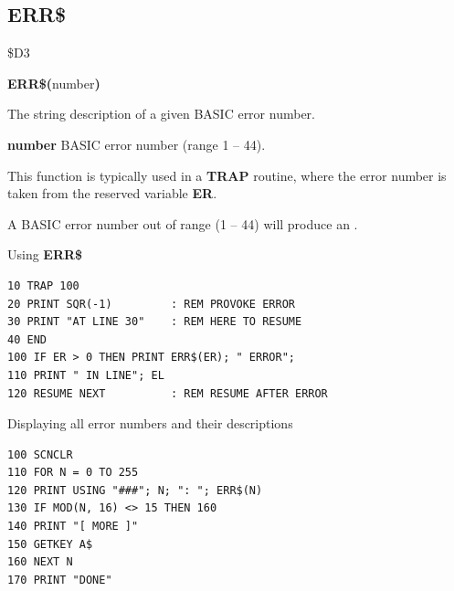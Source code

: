 
\newpage
\subsection{ERR\$}
\begin{description}[leftmargin=2cm,style=nextline]
\item [Token:]    \$D3

\item [Format:]   {\bf ERR\$(}number{\bf)}

\item [Returns:]  The string description of a given BASIC error number.

                  {\bf number} BASIC error number (range  1 -- 44).

                  This function is typically used in a {\bf TRAP} routine, where the error number is taken from the reserved variable {\bf ER}.

\item [Remarks:]  A BASIC error number out of range (1 -- 44) will produce an .

\item [Examples:] Using {\bf ERR\$}

\begin{tcolorbox}[colback=black,coltext=white]
\verbatimfont{\codefont}
\begin{verbatim}
10 TRAP 100
20 PRINT SQR(-1)         : REM PROVOKE ERROR
30 PRINT "AT LINE 30"    : REM HERE TO RESUME
40 END
100 IF ER > 0 THEN PRINT ERR$(ER); " ERROR";
110 PRINT " IN LINE"; EL
120 RESUME NEXT          : REM RESUME AFTER ERROR
\end{verbatim}
\end{tcolorbox}

                  Displaying all error numbers and their descriptions

\begin{tcolorbox}[colback=black,coltext=white]
\verbatimfont{\codefont}
\begin{verbatim}
100 SCNCLR
110 FOR N = 0 TO 255
120 PRINT USING "###"; N; ": "; ERR$(N)
130 IF MOD(N, 16) <> 15 THEN 160
140 PRINT "[ MORE ]"
150 GETKEY A$
160 NEXT N
170 PRINT "DONE"
\end{verbatim}
\end{tcolorbox}
\end{description}



